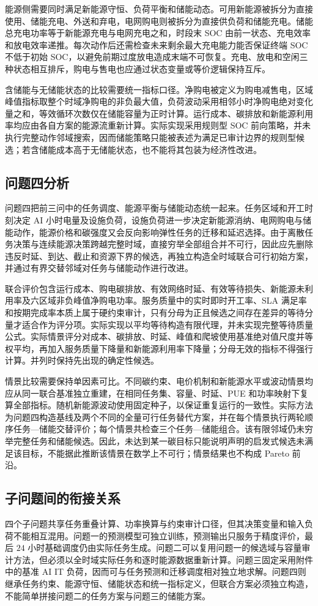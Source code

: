 能源侧需要同时满足新能源守恒、负荷平衡和储能动态。可用新能源被拆分为直接使用、储能充电、外送和弃电，电网购电则被拆分为直接供负荷和储能充电。储能总充电功率等于新能源充电与电网充电之和，时段末 SOC 由前一状态、充电效率和放电效率递推。每次动作后还需检查未来剩余最大充电能力能否保证终端 SOC 不低于初始 SOC，以避免前期过度放电造成末端不可恢复。充电、放电和空闲三种状态相互排斥，购电与售电也应通过状态变量或等价逻辑保持互斥。

含储能与无储能状态的比较需要统一指标口径。净购电被定义为购电减售电，区域峰值指标取整个时域净购电的非负最大值，负荷波动采用相邻小时净购电绝对变化量之和，等效循环次数仅在储能容量为正时计算。运行成本、碳排放和新能源利用率均应由各自方案的能源流重新计算。实际实现采用规则型 SOC 前向策略，并未执行完整动作邻域搜索，因而储能策略只能被表述为满足已审计边界的规则型候选；若含储能成本高于无储能状态，也不能将其包装为经济性改进。

\subsection{问题四分析}

问题四把前三问中的任务调度、能源平衡与储能动态统一起来。任务区域和开工时刻决定 AI 小时电量及设施负荷，设施负荷进一步决定新能源消纳、电网购电与储能动作，能源价格和碳强度又会反向影响弹性任务的迁移和延迟选择。由于离散任务决策与连续能源决策跨越完整时域，直接穷举全部组合并不可行，因此应先删除违反时延、到达、截止和资源下界的候选，再独立构造全时域联合可行初始方案，并通过有界交替邻域对任务与储能动作进行改进。

联合评价包含运行成本、购电碳排放、有效网络时延、有效等待损失、新能源未利用率及六区域非负峰值净购电功率。服务质量中的实时即时开工率、SLA 满足率和按期完成率本质上属于硬约束审计，只有分母为正且候选之间存在差异的等待分量才适合作为评分项。实际实现以平均等待构造有限代理，并未实现完整等待质量公式。实际情景评分对成本、碳排放、时延、峰值和爬坡使用基准绝对值尺度并等权平均，再加入服务质量下降量和新能源利用率下降量；分母无效的指标不得强行计算。并列时保持先出现的确定性候选。

情景比较需要保持单因素可比。不同碳约束、电价机制和新能源水平或波动情景均应从同一联合基准独立重建，在相同任务集、容量、时延、PUE 和功率映射下复算全部指标。随机新能源波动使用固定种子，以保证重复运行的一致性。实际方法为问题四构造基线及两个不同的全量可行任务替代方案，并在每个情景执行两轮顺序任务—储能交替评价；每个情景共检查三个任务—储能组合。该有限邻域仍未穷举完整任务和储能候选。因此，未达到某一碳目标只能说明声明的启发式候选未满足该目标，不能据此推断该情景在数学上不可行；情景结果也不构成 Pareto 前沿。

\subsection{子问题间的衔接关系}

四个子问题共享任务重叠计算、功率换算与约束审计口径，但其决策变量和输入负荷不能相互混用。问题一的预测模型可独立训练，预测输出只服务于精度评价，最后 $24$ 小时基础调度仍由实际任务生成。问题二可以复用问题一的候选域与容量审计方法，但必须以全时域实际任务和逐时能源数据重新计算。问题三固定采用附件中的基准 AI IT 负荷，因而可与任务预测和迁移调度相对独立地求解。问题四则继承任务约束、能源守恒、储能状态和统一指标定义，但联合方案必须独立构造，不能简单拼接问题二的任务方案与问题三的储能方案。
